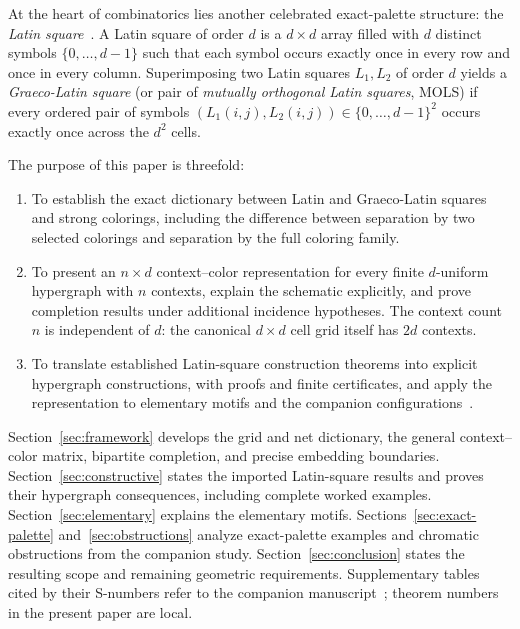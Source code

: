 \documentclass[aps,pra,reprint,superscriptaddress,longbibliography,nofootinbib,floatfix,10pt]{revtex4-2}
\theoremstyle{definition}\newtheorem{definition}[theorem]{Definition}
\theoremstyle{remark}\newtheorem{remark}[theorem]{Remark}
\begin{document}
At the heart of combinatorics lies another celebrated exact-palette structure: the \emph{Latin square}~\cite{bose1960further,wanless2002plex}. A Latin square of order $d$ is a $d\times d$ array filled with $d$ distinct symbols $\{0,\ldots,d-1\}$ such that each symbol occurs exactly once in every row and once in every column. Superimposing two Latin squares $L_1,L_2$ of order $d$ yields a \emph{Graeco-Latin square} (or pair of \emph{mutually orthogonal Latin squares}, MOLS) if every ordered pair of symbols $(L_1(i,j),L_2(i,j))\in\{0,\ldots,d-1\}^2$ occurs exactly once across the $d^2$ cells.

The purpose of this paper is threefold:
\begin{enumerate}
\item To establish the exact dictionary between Latin and Graeco-Latin squares and strong colorings, including the difference between separation by two selected colorings and separation by the full coloring family.
\item To present an $n\times d$ context--color representation for every finite $d$-uniform hypergraph with $n$ contexts, explain the schematic explicitly, and prove completion results under additional incidence hypotheses. The context count $n$ is independent of $d$: the canonical $d\times d$ cell grid itself has $2d$ contexts.
\item To translate established Latin-square construction theorems into explicit hypergraph constructions, with proofs and finite certificates, and apply the representation to elementary motifs and the companion configurations~\cite{svozil2026contexts,supplement}.
\end{enumerate}

Section~\ref{sec:framework} develops the grid and net dictionary, the general context--color matrix, bipartite completion, and precise embedding boundaries. Section~\ref{sec:constructive} states the imported Latin-square results and proves their hypergraph consequences, including complete worked examples. Section~\ref{sec:elementary} explains the elementary motifs. Sections~\ref{sec:exact-palette} and~\ref{sec:obstructions} analyze exact-palette examples and chromatic obstructions from the companion study. Section~\ref{sec:conclusion} states the resulting scope and remaining geometric requirements. Supplementary tables cited by their S-numbers refer to the companion manuscript~\cite{svozil2026contexts,supplement}; theorem numbers in the present paper are local.

\end{document}
